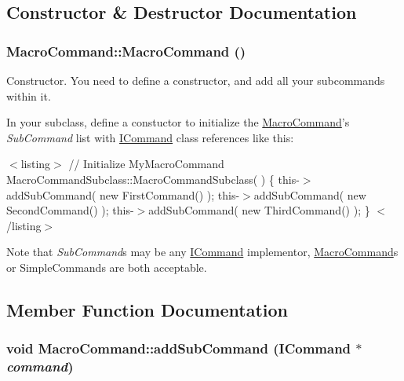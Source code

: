 \subsection{Constructor \& Destructor Documentation}
\hypertarget{class_pure_m_v_c_1_1_macro_command_abf91c7c1114f20b006cf95bf8c4614e7}{
\subsubsection[{MacroCommand}]{\setlength{\rightskip}{0pt plus 5cm}MacroCommand::MacroCommand ()}}
\label{class_pure_m_v_c_1_1_macro_command_abf91c7c1114f20b006cf95bf8c4614e7}


Constructor. You need to define a constructor, and add all your subcommands within it.

In your subclass, define a constuctor to initialize the {\ttfamily \hyperlink{class_pure_m_v_c_1_1_macro_command}{MacroCommand}}'s {\itshape SubCommand\/} list with {\ttfamily \hyperlink{class_pure_m_v_c_1_1_i_command}{ICommand}} class references like this:

$<$listing$>$ // Initialize MyMacroCommand MacroCommandSubclass::MacroCommandSubclass( ) \{ this-\/$>$addSubCommand( new FirstCommand() ); this-\/$>$addSubCommand( new SecondCommand() ); this-\/$>$addSubCommand( new ThirdCommand() ); \} $<$/listing$>$

Note that {\itshape SubCommand\/}s may be any {\ttfamily \hyperlink{class_pure_m_v_c_1_1_i_command}{ICommand}} implementor, {\ttfamily \hyperlink{class_pure_m_v_c_1_1_macro_command}{MacroCommand}}s or {\ttfamily SimpleCommands} are both acceptable. 

\subsection{Member Function Documentation}
\hypertarget{class_pure_m_v_c_1_1_macro_command_a0e9c878d286520ebbf2964e4ba8a76b8}{
\subsubsection[{addSubCommand}]{\setlength{\rightskip}{0pt plus 5cm}void MacroCommand::addSubCommand ({\bf ICommand} $\ast$ {\em command})}}
\label{class_pure_m_v_c_1_1_macro_command_a0e9c878d286520ebbf2964e4ba8a76b8}


